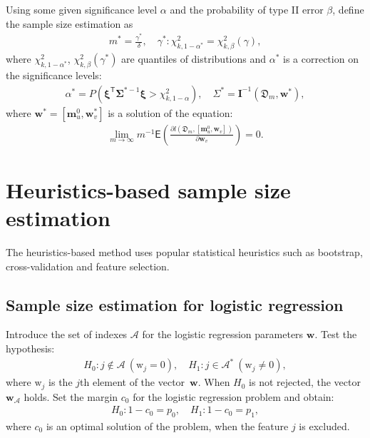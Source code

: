 \documentclass[
11pt,%
tightenlines,%
twoside,%
onecolumn,%
nofloats,%
nobibnotes,%
nofootinbib,%
superscriptaddress,%
noshowpacs,%
centertags]%
{revtex4}
\begin{document}
Using some given significance level $\alpha$ and the probability of type II error $\beta$, define the sample size estimation as
\[
\label{eq:sb:18}
\begin{aligned}
	m^* = \frac{\gamma^*}{\delta}, \quad \gamma^*:\chi^2_{k, 1-\alpha^{*}} = \chi^2_{k, \beta}\left(\gamma\right),
\end{aligned}
\]
where $\chi^2_{k, 1-\alpha^*}$, $\chi^2_{k, \beta}\left(\gamma^*\right)$ are quantiles of distributions and $\alpha^*$ is a correction on the significance levels:
\[
\label{eq:sb:19}
\begin{aligned}
	\alpha^* = P\left(\bm{\xi}^{\mathsf{T}}\bm{\Sigma}^{*-1} \bm{\xi} > \chi^2_{k,1 - \alpha}\right), \quad \Sigma^* = \textbf{I}^{-1}\left(\mathfrak{D}_m, \textbf{w}^*\right),
\end{aligned}
\]
where $\textbf{w}^{*} = \left[\textbf{m}_{u}^{0}, \textbf{w}^{*}_v\right]$  is a solution of the equation:
\[
\label{eq:sb:20}
\begin{aligned}
	\lim_{m\to\infty}m^{-1}\mathsf{E}\left(\frac{\partial l\left(\mathfrak{D}_m, \left[ \textbf{m}_{u}^{0}, \textbf{w}_{v}\right]\right)}{\partial \textbf{w}_{v}}\right) = 0.
\end{aligned}
\]

\section{Heuristics-based sample size estimation}
The heuristics-based method uses popular statistical heuristics such as bootstrap, cross-validation and feature selection.
\subsection{Sample size estimation for logistic regression}
Introduce the set of indexes $\mathcal{A}$ for the logistic regression parameters $\textbf{w}$. Test the hypothesis:
\[
\label{eq:hb:1}
\begin{aligned}
	H_0: j \not\in\mathcal{A}~\left(\text{w}_{j} = 0\right), \quad H_1: j \in \mathcal{A}^*~\left(\text{w}_{j} \not= 0\right),
\end{aligned}
\]
where $\text{w}_{j}$ is the $j$th element of the vector~$\textbf{w}$. When $H_0$ is not rejected, the vector $\textbf{w}_{\mathcal{A}}$ holds.
Set the margin $c_0$  for the logistic regression problem and obtain:
\[
\label{eq:hb:2}
\begin{aligned}
	H_0: 1-c_0 = p_0, \quad H_1: 1-c_0 = p_1,
\end{aligned}
\]
where $c_0$ is an optimal solution of the problem, when the feature $j$ is excluded.
\end{document}
